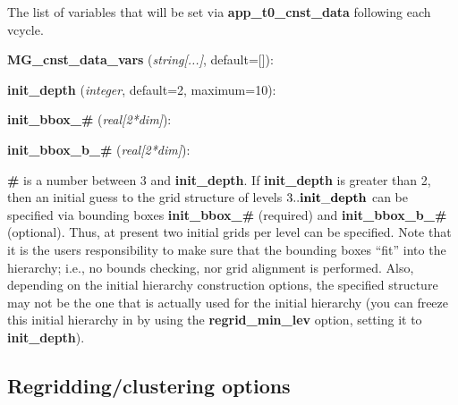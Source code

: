 \documentclass[aps,amssymb,unsortedaddress,nofootinbib]{revtex4}
\def\lsep{\itemsep 0.05in}
\begin{document}
\begin{list}{}{\lsep}
      The list of variables that will be set via {\bf app\_t0\_cnst\_data} following
      each vcycle.
\item {\bf MG\_cnst\_data\_vars} ({\em string[...]}, default=[]):
\item
\item {\bf init\_depth} ({\em integer}, default=2, maximum=10):
\item {\bf init\_bbox\_\#} ({\em real[2*dim]}): 
\item {\bf init\_bbox\_b\_\#} ({\em real[2*dim]}): 
   \begin{list}{}{\lsep}
      \item
      {\bf \#} is a number between 3 and {\bf init\_depth}.
      If {\bf init\_depth} is greater than 2, then an initial guess to the grid structure of 
      levels $3..{\bf init\_depth}$ can be specified via bounding boxes {\bf init\_bbox\_\#} (required) and
      {\bf init\_bbox\_b\_\#} (optional). Thus, at present two initial grids per level can be
      specified. Note that it is the users responsibility to make sure that the bounding
      boxes ``fit'' into the hierarchy; i.e., no bounds checking, nor grid alignment is performed.
      Also, depending on the initial hierarchy construction options, the specified structure
      may not be the one that is actually used for the initial hierarchy (you can freeze this
      initial hierarchy in by using the {\bf regrid\_min\_lev} option, setting it to {\bf init\_depth}).
   \end{list}
\end{list}

\subsection{Regridding/clustering options}\label{sec_rgc_ops}
\end{document}
